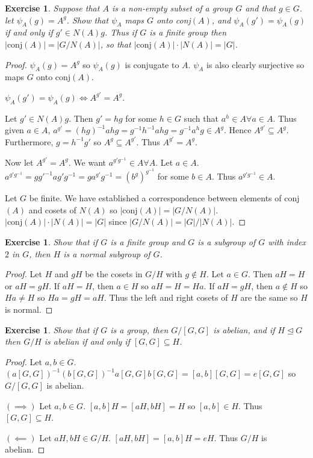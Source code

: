 \documentclass{article}
\newtheorem{exercise}[theorem]{Exercise}
\begin{document}
\begin{exercise}
Suppose that $A$ is a non-empty subset of a group $G$ and that $g\in G$. let $\psi_A(g)=A^g$. Show that $\psi_A$ maps $G$ onto conj$(A)$, and $\psi_A(g')=\psi_A(g)$ if and only if $g'\in N(A)g$. Thus if $G$ is a finite group then $|\text{conj}(A)|=|G/N(A)|$, so that $|\text{conj}(A)|\cdot|N(A)|=|G|$.
\end{exercise}
\begin{proof}
$\psi_A(g)=A^g$ so $\psi_A(g)$ is conjugate to $A$. $\psi_A$ is also clearly surjective so maps $G$ onto conj$(A)$.

$\psi_A(g')=\psi_A(g)\iff A^{g'}=A^g$.

Let $g'\in N(A)g$. Then $g'=hg$ for some $h\in G$ such that $a^h\in A\forall a\in A$. Thus given $a\in A$, $a^{g'}=(hg)^{-1}ahg=g^{-1}h^{-1}ahg=g^{-1}a^hg\in A^g$. Hence $A^{g'}\subseteq A^g$. Furthermore, $g=h^{-1}g'$ so $A^g\subseteq A^{g'}$. Thus $A^{g'}=A^g$.

Now let $A^{g'}=A^g$. We want $a^{g'g^{-1}}\in A\forall A$. Let $a\in A$. $a^{g'g^{-1}}=gg'^{-1}ag'g^{-1}=ga^{g'}g^{-1}=(b^g)^{g^{-1}}$ for some $b\in A$. Thus $a^{g'g^{-1}}\in A$.

Let $G$ be finite. We have established a correspondence between elements of conj$(A)$ and cosets of $N(A)$ so $|\text{conj}(A)|=|G/N(A)|$. $|\text{conj}(A)|\cdot|N(A)|=|G|$ since $|G/N(A)|=|G|/|N(A)|$. 
\end{proof}

\begin{exercise}
Show that if $G$ is a finite group and $G$ is a subgroup of $G$ with index $2$ in $G$, then $H$ is a normal subgroup of $G$.
\end{exercise}
\begin{proof}
Let $H$ and $gH$ be the cosets in $G/H$ with $g\notin H$. Let $a\in G$. Then $aH=H$ or $aH=gH$. If $aH=H$, then $a\in H$ so $aH=H=Ha$. If $aH=gH$, then $a\notin H$ so $Ha\neq H$ so $Ha=gH=aH$. Thus the left and right cosets of $H$ are the same so $H$ is normal.
\end{proof}

\begin{exercise}
Show that if $G$ is a group, then $G/[G,G]$ is abelian, and if $H\trianglelefteq G$ then $G/H$ is abelian if and only if $[G,G]\subseteq H$.
\end{exercise}
\begin{proof}
Let $a,b\in G$. $(a[G,G])^{-1}(b[G,G])^{-1}a[G,G]b[G,G]=[a,b][G,G]=e[G,G]$ so $G/[G,G]$ is abelian.

$(\implies)$ Let $a,b\in G$. $[a,b]H=[aH,bH]=H$ so $[a,b]\in H$. Thus $[G,G]\subseteq H$.

$(\impliedby)$ Let $aH,bH\in G/H$. $[aH,bH]=[a,b]H=eH$. Thus $G/H$ is abelian.
\end{proof}
\end{document}

